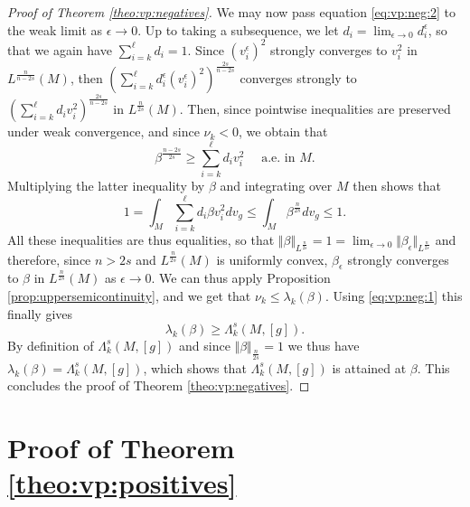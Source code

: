 \documentclass[10pt]{amsart}
\numberwithin{equation}{section}
\def\ep{{\varepsilon}}
\def \ep{\epsilon}
\theoremstyle{plain}
\theoremstyle{remark}
\begin{document}
\begin{proof}[Proof of Theorem \ref{theo:vp:negatives}]
\medskip

We may now pass equation \eqref{eq:vp:neg:2} to the weak limit as $\epsilon \to 0$. Up to taking a subsequence, we let $d_i = \lim_{\epsilon \to 0} d_i^{\epsilon}$, so that we again have $\sum_{i=k}^\ell d_i = 1$.  Since $(v_i^{\epsilon})^2$ strongly converges to $v_i^2$ in $L^{\frac{n}{n-2s}}(M)$,
 then $\left(\sum_{i=k}^{\ell} d_i^\ep \left(v_i^\ep\right) ^2 \right)^{\frac{2s}{n-2s}}$ converges strongly to  $\left(\sum_{i=k}^{\ell} d_i v_i^2\right)^{\frac{2s}{n-2s}}$ in $L^{\frac{n}{2s}}(M)$. Then, since pointwise inequalities are preserved under weak convergence, and since $\nu_k < 0$, we obtain that
$$ \beta^{\frac{n-2s}{2s}} \ge  \sum_{i=k}^{\ell} d_i v_i ^2  \quad \text{ a.e. in } M. $$
Multiplying the latter inequality by $\beta$ and integrating over $M$ then shows that 
$$ 1 = \int_M   \sum_{i=k}^{\ell} d_i \beta v_i ^2 dv_g \le \int_M \beta^{\frac{n}{2s}}dv_g  \le 1. $$
All these inequalities are thus equalities, so that $\Vert \beta \Vert_{L^{\frac{n}{2s}}} = 1 = \lim_{\epsilon \to 0} \Vert \beta_\epsilon \Vert_{L^{\frac{n}{2s}}}$ and therefore, since $n > 2s$ and $L^{\frac{n}{2s}}(M)$ is uniformly convex, $\beta_\epsilon$ strongly converges to $\beta$ in $L^{\frac{n}{2s}}(M)$ as $\epsilon \to 0$. 
We can thus apply Proposition \ref{prop:uppersemicontinuity}, and we get that $\nu_k \le \lambda_k(\beta)$. Using \eqref{eq:vp:neg:1} this finally gives
$$ \lambda_k(\beta) \ge \Lambda_k^s(M,[g]) .$$
By definition of $\Lambda_k^s(M,[g])$ and since $\Vert \beta \Vert_{\frac{n}{2s}} = 1$ we thus have $\lambda_k(\beta) = \Lambda_k^s(M,[g])$, which shows that $\Lambda_k^s(M,[g])$ is attained at $\beta$. This concludes the proof of Theorem \ref{theo:vp:negatives}. 
\end{proof}


\section{Proof of Theorem \ref{theo:vp:positives}} \label{proof_theorems}
\end{document}
